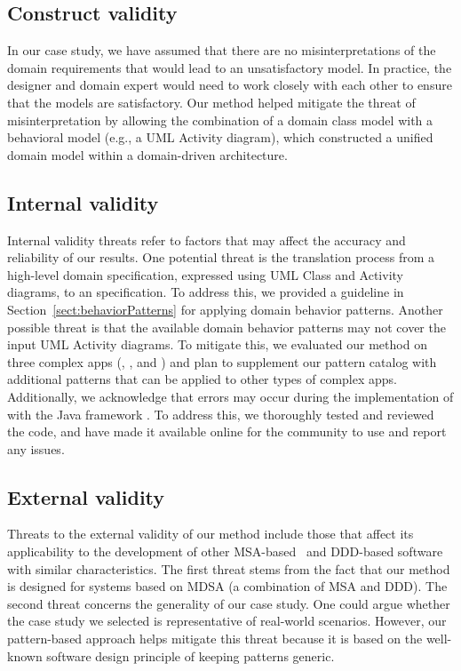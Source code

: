 \subsection{Construct validity}
In our case study, we have assumed that there are no misinterpretations of the domain requirements that would lead to an unsatisfactory model. In practice, the designer and domain expert would need to work closely with each other to ensure that the models are satisfactory.
Our method helped mitigate the threat of misinterpretation by allowing the combination of a domain class model with a behavioral model (e.g., a UML Activity diagram), which constructed a unified domain model within a domain-driven architecture.
%
\subsection{Internal validity}
Internal validity threats refer to factors that may affect the accuracy and reliability of our results. One potential threat is the translation process from a high-level domain specification, expressed using UML Class and Activity diagrams, to an \agldcsl specification. To address this, we provided a guideline in Section~\ref{sect:behaviorPatterns} for applying domain behavior patterns. Another possible threat is that the available domain behavior patterns may not cover the input UML Activity diagrams. To mitigate this, we evaluated our method on three complex apps (\courseman, \processman, and \orderman) and plan to supplement our pattern catalog with additional patterns that can be applied to other types of complex apps. Additionally, we acknowledge that errors may occur during the implementation of \agldcsl with the Java framework \jdomainapp. To address this, we thoroughly tested and reviewed the code, and have made it available online for the community to use and report any issues.


\subsection{External validity}
Threats to the external validity of our method include those that affect its applicability to the development of other MSA-based~\cite{Newman:15:MS} and DDD-based software with similar characteristics. The first threat stems from the fact that our method is designed for systems based on MDSA (a combination of MSA and DDD). The second threat concerns the generality of our case study. One could argue whether the case study we selected is representative of real-world scenarios. However, our pattern-based approach helps mitigate this threat because it is based on the well-known software design principle of keeping patterns generic.
